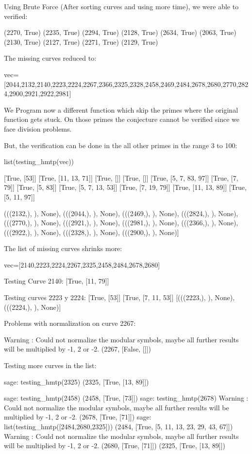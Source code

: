  
 Using Brute Force (After sorting curves and using more time), we were able to verified:

(2270, True)
(2235, True)
(2294, True)
(2128, True)
(2634, True)
(2063, True)
(2130, True)
(2127, True)
(2271, True)
(2129, True)

The missing curves reduced to:

vec=[2044,2132,2140,2223,2224,2267,2366,2325,2328,2458,2469,2484,2678,2680,2770,2824,2900,2921,2922,2981] 

We Program now a different function which skip the primes where the
original function gets stuck. On those primes the conjecture cannot
be verified since we face division problems.

But, the verification can be done in the all other primes in the range 3 to 100:

list(testing_hmtp(vec))

[True, [53]]
[True, [11, 13, 71]]
[True, []]
[True, []]
[True, [5, 7, 83, 97]]
[True, [7, 79]]
[True, [5, 83]]
[True, [5, 7, 13, 53]]
[True, [7, 19, 79]]
[True, [11, 13, 89]]
[True, [5, 11, 97]]

(((2132,), {}), None),
 (((2044,), {}), None),
 (((2469,), {}), None),
 (((2824,), {}), None),
 (((2770,), {}), None),
 (((2921,), {}), None),
 (((2981,), {}), None),
 (((2366,), {}), None),
 (((2922,), {}), None),
 (((2328,), {}), None),
 (((2900,), {}), None)]
 

 The list of missing curves shrinks more:

vec=[2140,2223,2224,2267,2325,2458,2484,2678,2680] 

Testing Curve 2140:
[True, [11, 79]]

Testing curves 2223 y 2224:
[True, [53]]
[True, [7, 11, 53]]
[(((2223,), {}), None), (((2224,), {}), None)]

Problems with normalization on curve 2267:

Warning : Could not normalize the modular symbols, maybe all further results will be multiplied by -1, 2 or -2.
(2267, [False, []])

Testing more curves in the list:

sage: testing_hmtp(2325)
(2325, [True, [13, 89]])

sage: testing_hmtp(2458)
(2458, [True, [73]])
sage: testing_hmtp(2678)
Warning : Could not normalize the modular symbols, maybe all further results will be multiplied by -1, 2 or -2.
(2678, [True, [71]])
sage: list(testing_hmtp([2484,2680,2325]))
(2484, [True, [5, 11, 13, 23, 29, 43, 67]])
Warning : Could not normalize the modular symbols, maybe all further results will be multiplied by -1, 2 or -2.
(2680, [True, [71]])
(2325, [True, [13, 89]])

